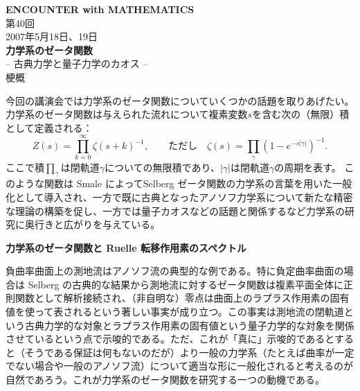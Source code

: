 \documentclass[uplatex,dvipdfmx]{jlreq}
\begin{document}
\begin{center}
  \vspace*{20pt}
  {\Huge\bfseries ENCOUNTER with MATHEMATICS}\\[10pt]
  {\Large 第40回}\\[6pt]
  {\large 2007年5月18日、19日}\\[20pt]
  {\Huge\bfseries 力学系のゼータ関数}\\[6pt]
  {\Large -- 古典力学と量子力学のカオス --}\\[20pt]
  梗\qquad 概
\end{center}

今回の講演会では力学系のゼータ関数についていくつかの話題を取りあげたい。
力学系のゼータ関数は与えられた流れについて複素変数$s$を含む次の（無限）積として定義される：
\[
Z(s)=\prod_{k=0}^{\infty}\zeta(s+k)^{-1},\qquad\mbox{ただし} \quad  \zeta(s)=\prod_{\gamma}(1-e^{-s|\gamma|})^{-1}.
\]
ここで積$\prod_\gamma$は閉軌道$\gamma$についての無限積であり、$|\gamma|$は閉軌道$\gamma$の周期を表す。
このような関数は Smale によってSelberg ゼータ関数の力学系の言葉を用いた一般化として導入され、一方で既に古典となったアノソフ力学系について新たな精密な理論の構築を促し、一方では量子カオスなどの話題と関係するなど力学系の研究に奥行きと広がりを与えている。

\vfill

\newpage

\begin{center}
{\large\bfseries 力学系のゼータ関数と Ruelle 転移作用素のスペクトル}\\[6pt]
\hspace*{\fill}{\large\bfseries 辻井　正人（九州大学・数理学研究院）}
\end{center}

負曲率曲面上の測地流はアノソフ流の典型的な例である。特に負定曲率曲面の場合は Selberg の古典的な結果から測地流に対するゼータ関数は複素平面全体に正則関数として解析接続され、（非自明な）零点は曲面上のラプラス作用素の固有値を使って表されるという著しい事実が成り立つ。この事実は測地流の閉軌道という古典力学的な対象とラプラス作用素の固有値という量子力学的な対象を関係させているという点で示唆的である。ただ、これが「真に」示唆的であるとすると（そうである保証は何もないのだが）より一般の力学系（たとえば曲率が一定でない場合や一般のアノソフ流）について適当な形に一般化されると考えるのが自然であろう。これが力学系のゼータ関数を研究する一つの動機である。
\end{document}
